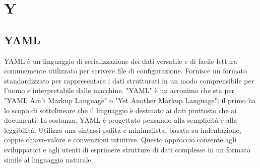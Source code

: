 \section{Y}

\vspace{2em}
\subsection*{YAML}
\par YAML è un linguaggio di serializzazione dei dati versatile e di facile lettura comunemente utilizzato per scrivere file di configurazione.
Fornisce un formato standardizzato per rappresentare i dati strutturati in un modo comprensibile per l'uomo e interpretabile dalle macchine. "YAML" è un acronimo che sta per "YAML Ain't Markup Language" o "Yet Another Markup Language"; il primo ha lo scopo di sottolineare che il linguaggio è destinato ai dati piuttosto che ai documenti.
In sostanza, YAML è progettato pensando alla semplicità e alla leggibilità. Utilizza una sintassi pulita e minimalista, basata su indentazione, coppie chiave-valore e convenzioni intuitive. Questo approccio consente agli sviluppatori e agli utenti di esprimere strutture di dati complesse in un formato simile al linguaggio naturale.
